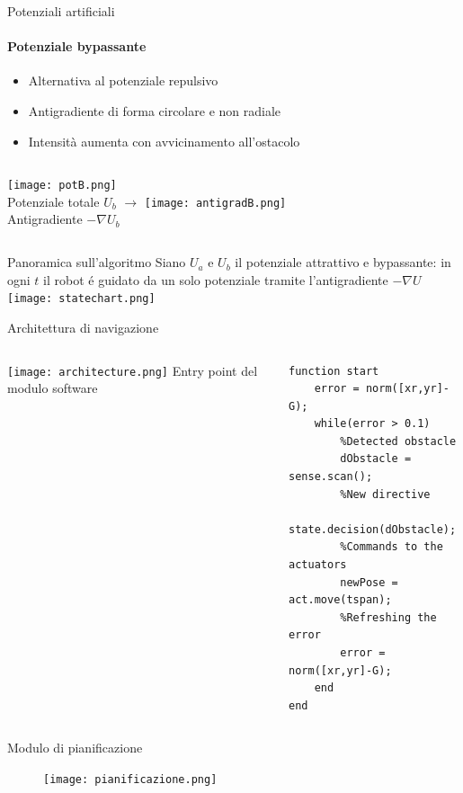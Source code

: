 \documentclass[handout]{beamer}
\begin{document}
\begin{frame}{Potenziali artificiali}
\framesubtitle{Potenziale bypassante}
\begin{itemize}
\item Alternativa al potenziale repulsivo
\item Antigradiente di forma circolare e non radiale
\item Intensità aumenta con avvicinamento all'ostacolo
\end{itemize}
\vspace{5mm}
\begin{columns}
\centering
\texttt{[image: potB.png]} \\
Potenziale totale $U_b$
\centering
$\rightarrow$
\centering
\texttt{[image: antigradB.png]} \\
Antigradiente $-\nabla U_b$
\end{columns}
\end{frame}

\begin{frame}{Panoramica sull'algoritmo}	
\centering
Siano $U_a$ e $U_b$ il potenziale attrattivo e bypassante: in ogni $t$ il robot é guidato da un solo potenziale tramite l'antigradiente $-\nabla U$ \\
\vspace*{5mm}
\texttt{[image: statechart.png]}
\end{frame}

\begin{frame}[fragile]{Architettura di navigazione}
\begin{columns}
\centering
\texttt{[image: architecture.png]}
\centering
Entry point del modulo software \\
\begin{lstlisting}
function start
	error = norm([xr,yr]-G);
	while(error > 0.1)
		%Detected obstacle 
		dObstacle = sense.scan();
		%New directive
		state.decision(dObstacle);
		%Commands to the actuators 
		newPose = act.move(tspan);
		%Refreshing the error
		error = norm([xr,yr]-G);
	end
end
\end{lstlisting}
\end{columns}
\end{frame}


\begin{frame}{Modulo di pianificazione}
\centering
\begin{figure}
\texttt{[image: pianificazione.png]}
\end{figure}
\end{frame}
\end{document}
